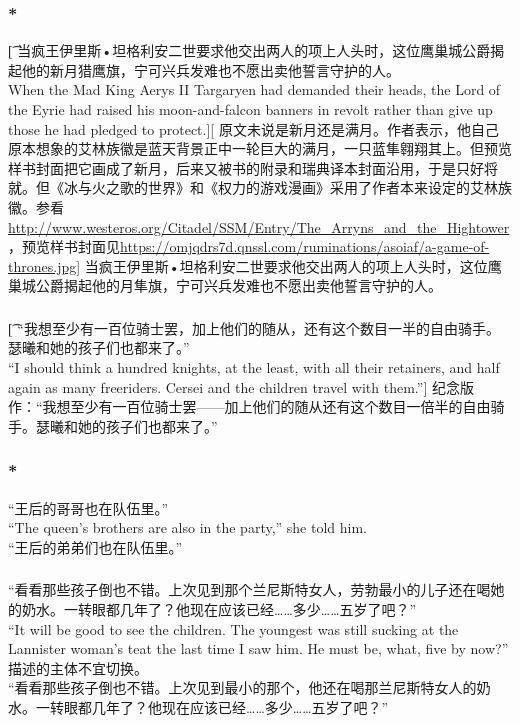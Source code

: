 \documentclass[12pt,a4paper]{article}
\begin{document}
\subsubsection{\color{red}*}\t[	
	当疯王伊里斯•坦格利安二世要求他交出两人的项上人头时，这位鹰巢城公爵揭起他的新月猎鹰旗，宁可兴兵发难也不愿出卖他誓言守护的人。\\
	When the Mad King Aerys II Targaryen had demanded their heads, the Lord of the Eyrie had raised his moon-and-falcon banners in revolt rather than give up those he had pledged to protect.][
	原文未说是新月还是满月。作者表示，他自己原本想象的艾林族徽是蓝天背景正中一轮巨大的满月，一只蓝隼翱翔其上。但预览样书封面把它画成了新月，后来又被书的附录和瑞典译本封面沿用，于是只好将就。但《冰与火之歌的世界》和《权力的游戏漫画》采用了作者本来设定的艾林族徽。参看\url{http://www.westeros.org/Citadel/SSM/Entry/The_Arryns_and_the_Hightower}，预览样书封面见\url{https://omjqdrs7d.qnssl.com/ruminations/asoiaf/a-game-of-thrones.jpg}]
	当疯王伊里斯•坦格利安二世要求他交出两人的项上人头时，这位鹰巢城公爵揭起他的月隼旗，宁可兴兵发难也不愿出卖他誓言守护的人。
		
\subsubsection{}\t[			
	“我想至少有一百位骑士罢，加上他们的随从，还有这个数目一半的自由骑手。瑟曦和她的孩子们也都来了。”\\
	“I should think a hundred knights, at the least, with all their retainers, and half again as many freeriders. Cersei and the children travel with them.”]
	纪念版作：“我想至少有一百位骑士罢——加上他们的随从还有这个数目一倍半的自由骑手。瑟曦和她的孩子们也都来了。”	
			
\subsubsection{\color{red}*}{\color{blue}
“王后的哥哥也在队伍里。”\\
“The queen's brothers are also in the party,” she told him.}\\
“王后的弟弟们也在队伍里。”
				
		
\subsubsection{}{\color{blue}
“看看那些孩子倒也不错。上次见到那个兰尼斯特女人，劳勃最小的儿子还在喝她的奶水。一转眼都几年了？他现在应该已经……多少……五岁了吧？”\\
“It will be good to see the children. The youngest was still sucking at the Lannister woman's teat the last time I saw him. He must be, what, five by now?”}\\
{\color{red}描述的主体不宜切换。}\\
“看看那些孩子倒也不错。上次见到最小的那个，他还在喝那兰尼斯特女人的奶水。一转眼都几年了？他现在应该已经……多少……五岁了吧？”
	
\end{document}
